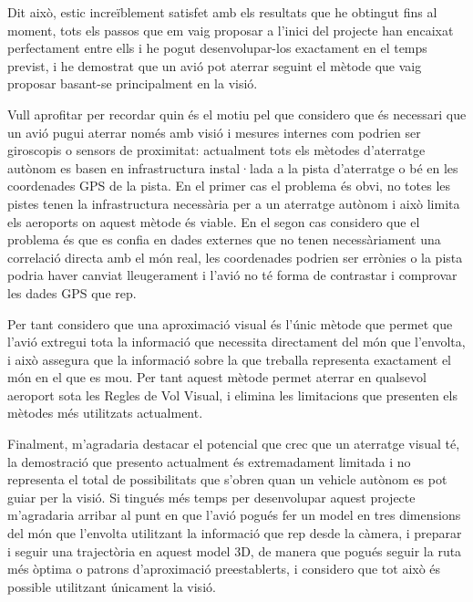 \documentclass[10pt,a4paper,twocolumn,twoside]{article}
\begin{document}
Dit això, estic increïblement satisfet amb els resultats que he obtingut fins al moment, tots els passos que em vaig proposar a l'inici 
del projecte han encaixat perfectament entre ells i he pogut desenvolupar-los exactament en el temps previst, i he demostrat que un avió 
pot aterrar seguint el mètode que vaig proposar basant-se principalment en la visió.

Vull aprofitar per recordar quin és el motiu pel que considero que és necessari que un avió pugui aterrar només amb visió i mesures internes
com podrien ser giroscopis o sensors de proximitat: actualment tots els mètodes d'aterratge autònom es basen en infrastructura instal·lada
a la pista d'aterratge o bé en les coordenades GPS de la pista. En el primer cas el problema és obvi, no totes les pistes tenen la 
infrastructura necessària per a un aterratge autònom i això limita els aeroports on aquest mètode és viable. En el segon cas considero 
que el problema és que es confia en dades externes que no tenen necessàriament una correlació directa amb el món real, les coordenades 
podrien ser errònies o la pista podria haver canviat lleugerament i l'avió no té forma de contrastar i comprovar les dades GPS que rep.

Per tant considero que una aproximació visual és l'únic mètode que permet que l'avió extregui tota la informació que necessita directament 
del món que l'envolta, i això assegura que la informació sobre la que treballa representa exactament el món en el que es mou. Per tant 
aquest mètode permet aterrar en qualsevol aeroport sota les Regles de Vol Visual, i elimina les limitacions que presenten els mètodes 
més utilitzats actualment.

Finalment, m'agradaria destacar el potencial que crec que un aterratge visual té, la demostració que presento actualment és extremadament 
limitada i no representa el total de possibilitats que s'obren quan un vehicle autònom es pot guiar per la visió. Si tingués més temps 
per desenvolupar aquest projecte m'agradaria arribar al punt en que l'avió pogués fer un model en tres dimensions del món que l'envolta 
utilitzant la informació que rep desde la càmera, i preparar i seguir una trajectòria en aquest model 3D, de manera que pogués seguir 
la ruta més òptima o patrons d'aproximació preestablerts, i considero que tot això és possible utilitzant únicament la visió.




\end{document}
